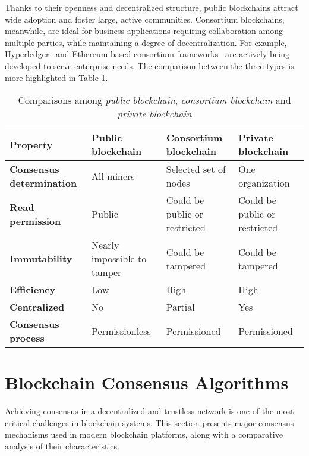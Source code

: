 Thanks to their openness and decentralized structure, public blockchains attract wide adoption and foster large, active communities. Consortium blockchains, meanwhile, are ideal for business applications requiring collaboration among multiple parties, while maintaining a degree of decentralization. For example, Hyperledger~\cite{hyperledger2015} and Ethereum-based consortium frameworks~\cite{ethereum2015consortium} are actively being developed to serve enterprise needs. The comparison between the three types is more highlighted in Table \ref{tab:blockchain_comparison}. 
\begin{table}[H]
\centering
\small
\vspace{-0.5em} %
\begin{tabular}{@{}p{4cm}|p{3.2cm}p{4.1cm}p{3.2cm}@{}}
\toprule
\textbf{Property} & \textbf{Public blockchain} & \textbf{Consortium blockchain} & \textbf{Private blockchain} \\
\midrule
\textbf{Consensus determination} & All miners & Selected set of nodes & One organization \\
\textbf{Read permission} & Public & Could be public or restricted & Could be public or restricted \\
\textbf{Immutability} & Nearly impossible to tamper & Could be tampered & Could be tampered \\
\textbf{Efficiency} & Low & High & High \\
\textbf{Centralized} & No & Partial & Yes \\
\textbf{Consensus process} & Permissionless & Permissioned & Permissioned \\
\bottomrule
\end{tabular}
\caption{\centering Comparisons among \textit{public blockchain}, \textit{consortium blockchain} and \textit{private blockchain}}
\label{tab:blockchain_comparison}
\end{table}

\section{Blockchain Consensus Algorithms }

Achieving consensus in a decentralized and trustless network is one of the most critical challenges in blockchain systems. This section presents major consensus mechanisms used in modern blockchain platforms, along with a comparative analysis of their characteristics.

